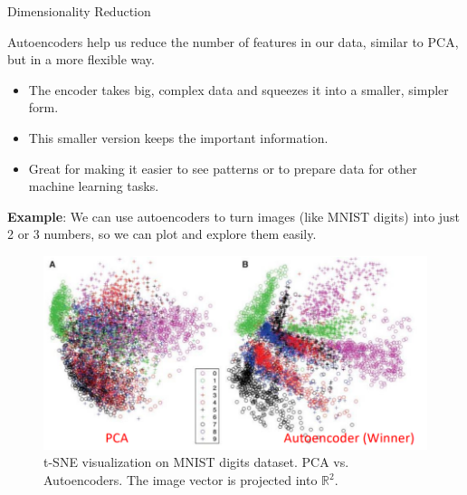 \begin{frame}[allowframebreaks]{Dimensionality Reduction}

Autoencoders help us reduce the number of features in our data, similar to PCA, but in a more flexible way.

\begin{itemize}
    \item The encoder takes big, complex data and squeezes it into a smaller, simpler form.
    \item This smaller version keeps the important information.
    \item Great for making it easier to see patterns or to prepare data for other machine learning tasks.
\end{itemize}

\textbf{Example}: We can use autoencoders to turn images (like MNIST digits) into just 2 or 3 numbers, so we can plot and explore them easily.

\framebreak

\begin{figure}
    \centering
    \includegraphics[height=0.75\textheight, width=\textwidth, keepaspectratio]{images/autoencoders/image_representation.PNG}
    \caption*{t-SNE visualization on MNIST digits dataset. PCA vs. Autoencoders. The image vector is projected into $\mathbb{R}^2$.}
\end{figure}

\end{frame}